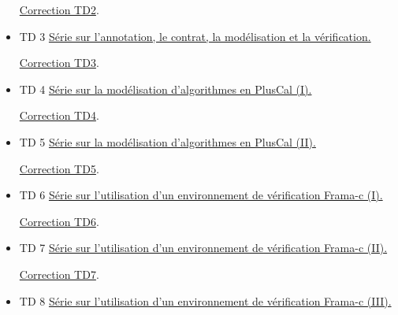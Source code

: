 \documentclass[ 12pt]{article}
\begin{document}
\begin{tcolorbox}
\begin{itemize}
          \href{http://mery54.github.io/teaching/mvsi/lecturesnotes/ctd2.pdf}{Correction 
            TD2}.
          
  \item[]   TD 3 
    \href{http://mery54.github.io/teaching/mvsi/lecturesnotes/td3.pdf}{
      Série sur l'annotation, le contrat, la  mod\'elisation et  la v\'erification.}

      \href{http://mery54.github.io/teaching/mvsi/lecturesnotes/ctd3.pdf}{Correction 
       TD3}.

\item[]   TD 4
    \href{http://mery54.github.io/teaching/mvsi/lecturesnotes/td4.pdf}{
      Série sur la mod\'elisation d'algorithmes en PlusCal  (I).}


      \href{http://mery54.github.io/teaching/mvsi/lecturesnotes/ctd4.pdf}{Correction 
       TD4}.


\item[]   TD 5
    \href{http://mery54.github.io/teaching/mvsi/lecturesnotes/td5.pdf}{
      Série sur la mod\'elisation d'algorithmes en PlusCal  (II).}


      \href{http://mery54.github.io/teaching/mvsi/lecturesnotes/ctd5.pdf}{Correction 
       TD5}.

     
\item[]   TD 6
    \href{http://mery54.github.io/teaching/mvsi/lecturesnotes/td6.pdf}{
      Série sur l'utilisation d'un environnement de  v\'erification Frama-c 
      (I).}
    

      \href{http://mery54.github.io/teaching/mvsi/lecturesnotes/ctd6.pdf}{Correction 
       TD6}.
    
     
\item[]   TD 7
    \href{http://mery54.github.io/teaching/mvsi/lecturesnotes/td7.pdf}{
      Série sur l'utilisation d'un environnement de  v\'erification Frama-c 
      (II).}
    

      \href{http://mery54.github.io/teaching/mvsi/lecturesnotes/ctd7.pdf}{Correction 
       TD7}.

     
\item[]   TD 8
    \href{http://mery54.github.io/teaching/mvsi/lecturesnotes/td8.pdf}{
      Série sur l'utilisation d'un environnement de  v\'erification Frama-c 
      (III).}
    


     

  \end{itemize}


\end{tcolorbox}
\end{document}
